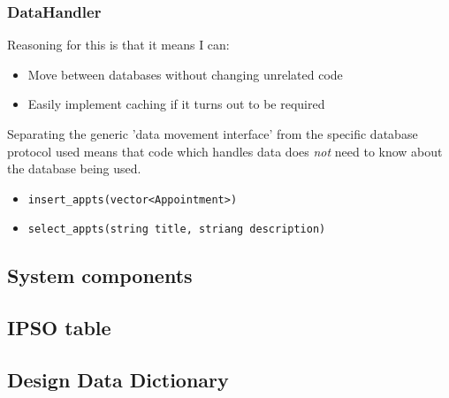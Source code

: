 \subsubsection{DataHandler}

Reasoning for this is that it means I can:

\begin{itemize}
    \item Move between databases without changing unrelated code
    \item Easily implement caching if it turns out to be required
\end{itemize}

Separating the generic 'data movement interface' from the specific database
protocol used means that code which handles data does \textit{not} need to know
about the database being used.

\begin{itemize}
    \item \verb+insert_appts(vector<Appointment>)+
    \item \verb+select_appts(string title, striang description)+
\end{itemize}


\subsection{System components}
\subsection{IPSO table}



\subsection{Design Data Dictionary}
